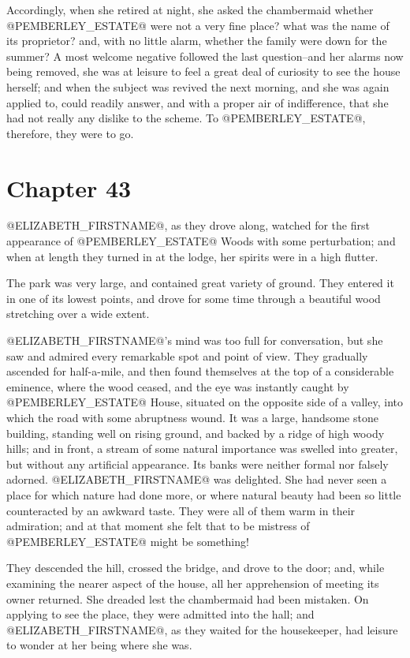 Accordingly, when she retired at night, she asked the chambermaid
whether @PEMBERLEY_ESTATE@ were not a very fine place? what was the name of its
proprietor? and, with no little alarm, whether the family were down for
the summer? A most welcome negative followed the last question--and her
alarms now being removed, she was at leisure to feel a great deal of
curiosity to see the house herself; and when the subject was revived the
next morning, and she was again applied to, could readily answer, and
with a proper air of indifference, that she had not really any dislike
to the scheme. To @PEMBERLEY_ESTATE@, therefore, they were to go.



\chapter*{Chapter 43}


@ELIZABETH_FIRSTNAME@, as they drove along, watched for the first appearance of
@PEMBERLEY_ESTATE@ Woods with some perturbation; and when at length they turned
in at the lodge, her spirits were in a high flutter.

The park was very large, and contained great variety of ground. They
entered it in one of its lowest points, and drove for some time through
a beautiful wood stretching over a wide extent.

@ELIZABETH_FIRSTNAME@'s mind was too full for conversation, but she saw and admired
every remarkable spot and point of view. They gradually ascended for
half-a-mile, and then found themselves at the top of a considerable
eminence, where the wood ceased, and the eye was instantly caught by
@PEMBERLEY_ESTATE@ House, situated on the opposite side of a valley, into which
the road with some abruptness wound. It was a large, handsome stone
building, standing well on rising ground, and backed by a ridge of
high woody hills; and in front, a stream of some natural importance was
swelled into greater, but without any artificial appearance. Its banks
were neither formal nor falsely adorned. @ELIZABETH_FIRSTNAME@ was delighted. She
had never seen a place for which nature had done more, or where natural
beauty had been so little counteracted by an awkward taste. They were
all of them warm in their admiration; and at that moment she felt that
to be mistress of @PEMBERLEY_ESTATE@ might be something!

They descended the hill, crossed the bridge, and drove to the door; and,
while examining the nearer aspect of the house, all her apprehension of
meeting its owner returned. She dreaded lest the chambermaid had been
mistaken. On applying to see the place, they were admitted into the
hall; and @ELIZABETH_FIRSTNAME@, as they waited for the housekeeper, had leisure to
wonder at her being where she was.

